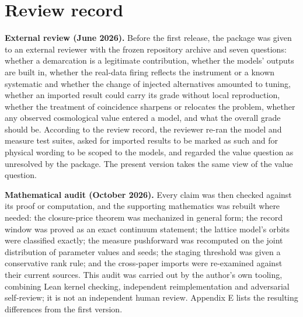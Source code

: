 \hypertarget{appendix-d-review-record}{%
\section{Review record}\label{appendix-d-review-record}}

\textbf{External review (June 2026).} Before the first release, the
package was given to an external reviewer with the frozen repository
archive and seven questions: whether a demarcation is a legitimate
contribution, whether the models' outputs are built in, whether the
real-data firing reflects the instrument or a known systematic and
whether the change of injected alternatives amounted to tuning, whether
an imported result could carry its grade without local reproduction,
whether the treatment of coincidence sharpens or relocates the problem,
whether any observed cosmological value entered a model, and what the
overall grade should be. According to the review record, the reviewer
re-ran the model and measure test suites, asked for imported results to
be marked as such and for physical wording to be scoped to the models,
and regarded the value question as unresolved by the package. The
present version takes the same view of the value question.

\textbf{Mathematical audit (October 2026).} Every claim was then checked
against its proof or computation, and the supporting mathematics was
rebuilt where needed: the closure-price theorem was mechanized in
general form; the record window was proved as an exact continuum
statement; the lattice model's orbits were classified exactly; the
measure pushforward was recomputed on the joint distribution of
parameter values and seeds; the staging threshold was given a
conservative rank rule; and the cross-paper imports were re-examined
against their current sources. This audit was carried out by the
author's own tooling, combining Lean kernel checking, independent
reimplementation and adversarial self-review; it is not an independent
human review. Appendix E lists the resulting differences from the first
version.
